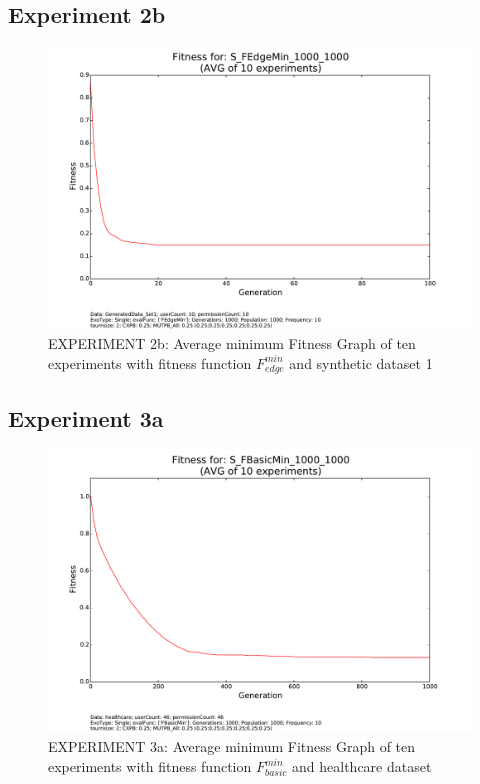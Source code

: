     
\subsection{Experiment 2b}
    \begin{figure}[H]
        \centering
        \includegraphics[scale=0.4, trim=0cm 2cm 0cm 0cm, clip=true]{./Figures/exp2bFitness}
        \caption{EXPERIMENT 2b: Average minimum Fitness Graph of ten experiments with fitness function $F_{edge}^{min}$ and synthetic dataset 1}
    \label{fig:exp2bfitness}
    \end{figure}


\subsection{Experiment 3a}
    \begin{figure}[H]
        \centering
        \includegraphics[scale=0.4, trim=0cm 2cm 0cm 0cm, clip=true]{./Figures/exp3aFitness}
        \caption{EXPERIMENT 3a: Average minimum Fitness Graph of ten experiments with fitness function $F_{basic}^{min}$ and healthcare dataset}
    \label{fig:exp3afitness}
    \end{figure}

